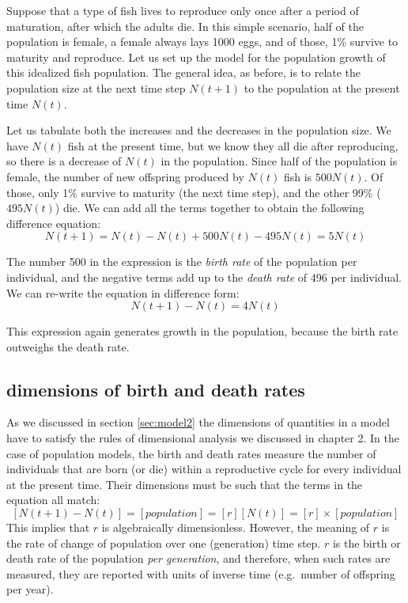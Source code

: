 \documentclass[
  letterpaper,
  DIV=11,
  numbers=noendperiod]{scrreprt}
\begin{document}
Suppose that a type of fish lives to reproduce only once after a period
of maturation, after which the adults die. In this simple scenario, half
of the population is female, a female always lays 1000 eggs, and of
those, 1\% survive to maturity and reproduce. Let us set up the model
for the population growth of this idealized fish population. The general
idea, as before, is to relate the population size at the next time step
\(N(t+1)\) to the population at the present time \(N(t)\).

Let us tabulate both the increases and the decreases in the
population size.
We have \(N(t)\) fish at the present time, but we know they all die
after reproducing, so there is a decrease of \(N(t)\) in the population.
Since half of the population is female, the number of new offspring
produced by \(N(t)\) fish is \(500N(t)\). Of those, only 1\% survive to
maturity (the next time step), and the other 99\% (\(495N(t)\)) die. We
can add all the terms together to obtain the following difference
equation: \[ 
N(t+1) = N(t) - N(t) + 500N(t) - 495 N(t)  = 5N(t)
\]

The number 500 in the expression is the 
\emph{birth rate} of the population per individual, and the negative
terms add up to the  \emph{death rate} of
496 per individual. We can re-write the equation in difference form: \[ 
N(t+1) - N(t) = 4N(t)
\]

This expression again generates growth in the population, because the
birth rate outweighs the death rate. \cite{allman_mathematical_2003}

\hypertarget{dimensions-of-birth-and-death-rates}{%
\subsection{dimensions of birth and death
rates}\label{dimensions-of-birth-and-death-rates}}

As we discussed in section \ref{sec:model2} the dimensions of quantities
in a model have to satisfy the rules of 
dimensional analysis we discussed in chapter 2. In the case of
population models, the birth and death rates measure the number of
individuals that are born (or die) within a reproductive cycle for every
individual at the present time. Their dimensions must be such that the
terms in the equation all match:
\[ [N(t+1) - N(t)] = [population] = [r] [N(t)] = [r]  \times [population] \]
This implies that \(r\) is algebraically dimensionless. However, the
meaning of \(r\) is the rate of change of population over one
(generation) time step. \(r\) is the birth or death rate of the
population \emph{per generation}, and therefore, when such rates are
measured, they are reported with units of inverse time (e.g.~number of
offspring per year).
\end{document}
